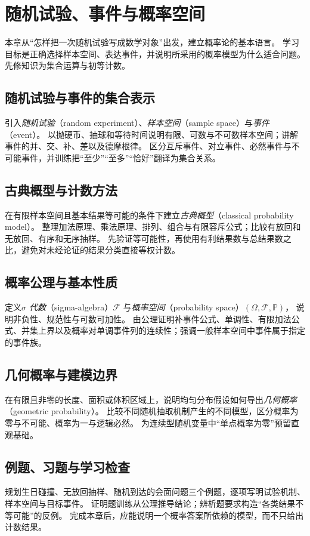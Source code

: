 \setcounter{chapter}{0} %
\chapter{随机试验、事件与概率空间}
\label{chap:ps-events}

本章从“怎样把一次随机试验写成数学对象”出发，建立概率论的基本语言。
学习目标是正确选择样本空间、表达事件，并说明所采用的概率模型为什么适合问题。先修知识为集合运算与初等计数。

\section{随机试验与事件的集合表示}
\label{sec:ps-events-language}
引入\emph{随机试验}（random experiment）、\emph{样本空间}（sample space）与\emph{事件}（event）。
以抛硬币、抽球和等待时间说明有限、可数与不可数样本空间；讲解事件的并、交、补、差以及德摩根律。
区分互斥事件、对立事件、必然事件与不可能事件，并训练把“至少”“至多”“恰好”翻译为集合关系。

\section{古典概型与计数方法}
\label{sec:ps-counting}
在有限样本空间且基本结果等可能的条件下建立\emph{古典概型}（classical probability model）。
整理加法原理、乘法原理、排列、组合与有限容斥公式；比较有放回和无放回、有序和无序抽样。
先验证等可能性，再使用有利结果数与总结果数之比，避免对未经论证的结果分类直接等权计数。

\section{概率公理与基本性质}
\label{sec:ps-probability-axioms}
定义\emph{$\sigma$ 代数}（sigma-algebra）$\mathcal F$ 与\emph{概率空间}（probability space）$(\Omega,\mathcal F,\mathbb P)$，
说明非负性、规范性与可数可加性。
由公理证明补事件公式、单调性、有限加法公式、并集上界以及概率对单调事件列的连续性；强调一般样本空间中事件属于指定的事件族。

\section{几何概率与建模边界}
\label{sec:ps-geometric-probability}
在有限且非零的长度、面积或体积区域上，说明均匀分布假设如何导出\emph{几何概率}（geometric probability）。
比较不同随机抽取机制产生的不同模型，区分概率为零与不可能、概率为一与逻辑必然。
为连续型随机变量中“单点概率为零”预留直观基础。

\section{例题、习题与学习检查}
规划生日碰撞、无放回抽样、随机到达的会面问题三个例题，逐项写明试验机制、样本空间与目标事件。
证明题训练从公理推导结论；辨析题要求构造“各类结果不等可能”的反例。
完成本章后，应能说明一个概率答案所依赖的模型，而不只给出计数结果。






